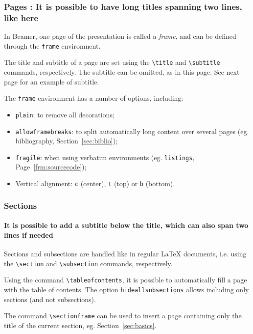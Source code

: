 \documentclass[10pt,    %
    english,            %
    xcolor=table,       %
    envcountsect,        %
    aspectratio=169     %
]{beamer}
\begin{document}
\begin{frame}
    \frametitle{Pages : It is possible to have long titles spanning two lines, like here} 
    
    In Beamer, one page of the presentation is called a \textit{frame}, and can be defined through the \texttt{frame} environment.
    
    \vspace{0.25cm}
    The title and subtitle of a page are set using the \texttt{\textbackslash{}title} and \texttt{\textbackslash{}subtitle} commands, respectively. The subtitle can be omitted, as in this page. See next page for an example of subtitle.
    
    \vspace{0.25cm}
    The \texttt{frame} environment has a number of options, including: 
    \begin{itemize}
        \item \texttt{plain}: to remove all decorations;
        \item \texttt{allowframebreaks}: to split automatically long content over several pages (eg. bibliography, Section~\ref{sec:biblio});
        \item \texttt{fragile}: when using verbatim environments (eg. \texttt{listings}, Page~\ref{frm:sourcecode});
        \item Vertical alignment: \texttt{c} (center), \texttt{t} (top) or \texttt{b} (bottom).
    \end{itemize}
\end{frame}

\begin{frame}
    \frametitle{Sections} 
    \framesubtitle{It is possible to add a subtitle below the title, which can also span two lines if needed}
    
    Sections and subsections are handled like in regular \LaTeX{} documents, i.e. using the \texttt{\textbackslash{}section} and \texttt{\textbackslash{}subsection} commands, respectively.
    
    \vspace{0.25cm}
    Using the command \texttt{\textbackslash{}tableofcontents}, it is possible to automatically fill a page with the table of contents. The option \texttt{hideallsubsections} allows including only sections (and not subsections).
    
    \vspace{0.25cm}
    The command \texttt{\textbackslash{}sectionframe} can be used to insert a page containing only the title of the current section, eg. Section~\ref{sec:basics}.
\end{frame}
\end{document}
